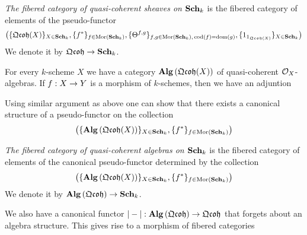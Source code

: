 \begin{definition}
\textit{The fibered category of quasi-coherent sheaves on $\mathbf{Sch}_k$} is the fibered category of elements of the pseudo-functor
$$\big(\{\mathfrak{Qcoh}(X)\}_{X\in \mathbf{Sch}_k},\{f^*\}_{f\in \mathrm{Mor}(\mathbf{Sch}_k)},\{\Theta^{f,g}\}_{f,g\in \mathrm{Mor}(\mathbf{Sch}_k),\,\mathrm{cod}(f)=\mathrm{dom}(g)},\{1_{1_{\mathfrak{Qcoh}(X)}}\}_{X\in \mathbf{Sch}_k}\big)$$
We denote it by $\mathfrak{Qcoh} \rightarrow \mathbf{Sch}_k$.
\end{definition}
\noindent
For every $k$-scheme $X$ we have a category $\mathbf{Alg}\left(\mathfrak{Qcoh}(X)\right)$ of quasi-coherent ${\mathcal O}_X$-algebras. If $f:X\rightarrow Y$ is a morphism of $k$-schemes, then we have an adjuntion
\begin{center}   
\end{center}
Using similar argument as above one can show that there exists a canonical structure of a pseudo-functor on the collection
$$\big(\{\mathbf{Alg}\left(\mathfrak{Qcoh}(X)\right)\}_{X\in \mathbf{Sch}_k},\{f^*\}_{f\in \mathrm{Mor}(\mathbf{Sch}_k)}\big)$$

\begin{definition}
\textit{The fibered category of quasi-coherent algebras on $\mathbf{Sch}_k$} is the fibered category of elements of the canonical pseudo-functor determined by the collection
$$\big(\{\mathbf{Alg}\left(\mathfrak{Qcoh}(X)\right)\}_{X\in \mathbf{Sch}_k},\{f^*\}_{f\in \mathrm{Mor}(\mathbf{Sch}_k)}\big)$$
We denote it by $\mathbf{Alg}\left(\mathfrak{Qcoh}\right)\rightarrow \mathbf{Sch}_k$.
\end{definition}

\begin{remark}\label{remark:from_qc_algebras_to_qc_sheaves_over_schemes}
We also have a canonical functor $|-|:\mathbf{Alg}\left(\mathfrak{Qcoh}\right)\rightarrow \mathfrak{Qcoh}$ that forgets about an algebra structure. This gives rise to a morphism of fibered categories
\begin{center}
\end{center}
\end{remark}

